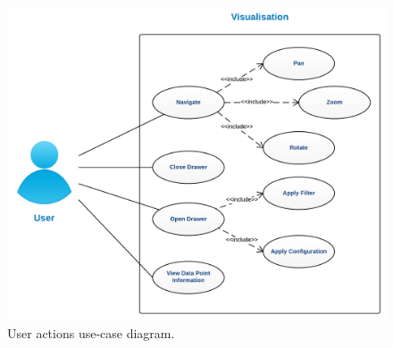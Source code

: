 
\begin{figure}[H]
	\centering
    \includegraphics[width=\textwidth]{images/design/user_actions}
    \caption[User actions]{User actions use-case diagram.}
    \label{fig:user_actions}
\end{figure}

